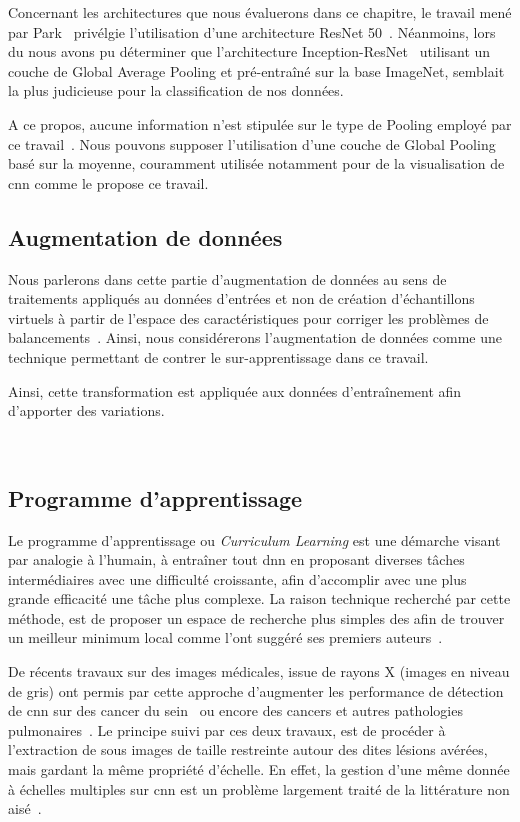 Concernant les architectures que nous évaluerons dans ce chapitre, le travail mené par Park~\cite{Park2019} privélgie l'utilisation d'une architecture ResNet 50~\cite{He2016}. Néanmoins, lors du  nous avons pu déterminer que l'architecture Inception-ResNet~\cite{Szegedy2017} utilisant un couche de Global Average Pooling et pré-entraîné sur la base ImageNet, semblait la plus judicieuse pour la classification de nos données.\par

A ce propos, aucune information n'est stipulée sur le type de Pooling employé par ce travail~\cite{Park2019}. Nous pouvons supposer l'utilisation d'une couche de Global Pooling basé sur la moyenne, couramment utilisée notamment pour de la visualisation de \gls{cnn} comme le propose ce travail.\par

\subsection{Augmentation de données}
Nous parlerons dans cette partie d'augmentation de données au sens de traitements appliqués au données d'entrées et non de création d'échantillons virtuels à partir de l'espace des caractéristiques pour corriger les problèmes de balancements~\cite{Wong2016}. Ainsi, nous considérerons l'augmentation de données comme une technique permettant de contrer le sur-apprentissage dans ce travail.\par


Ainsi, cette transformation est appliquée aux données d'entraînement afin d'apporter des variations.\par

~\cite{taylor2018}
\subsection{Programme d'apprentissage}
Le programme d'apprentissage ou \textit{Curriculum Learning} est une démarche visant par analogie à l'humain, à entraîner tout \gls{dnn} en proposant diverses tâches intermédiaires avec une difficulté croissante, afin d'accomplir avec une plus grande efficacité une tâche plus complexe. La raison technique recherché par cette méthode, est de proposer un espace de recherche plus simples des afin de trouver un meilleur minimum local comme l'ont suggéré ses premiers auteurs~\cite{Bengio2009}.\par

De récents travaux sur des images médicales, issue de rayons X (images en niveau de gris) ont permis par cette approche d'augmenter les performance de détection de \gls{cnn} sur des cancer du sein~\cite{Lotter2017} ou encore des cancers et autres pathologies pulmonaires~\cite{Park2019}. Le principe suivi par ces deux travaux, est de procéder à l'extraction de sous images de taille restreinte autour des dites lésions avérées, mais gardant la même propriété d'échelle. En effet, la gestion d'une même donnée à échelles multiples sur \gls{cnn} est un problème largement traité de la littérature non aisé~\cite{Noord2017}.\par

